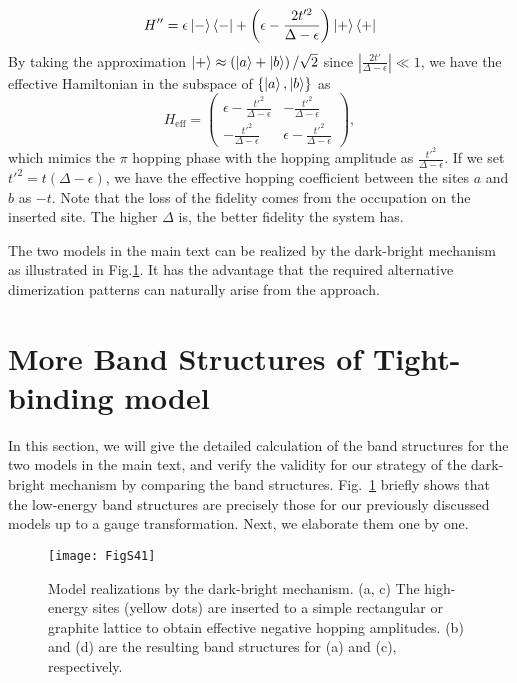 \documentclass[aps,prl,twocolumn,noshowpacs,superscriptaddress]{revtex4-1}
\begin{document}
\begin{equation}
	H''=\epsilon\ket{-}\bra{-}+\left(\epsilon-\frac{2t'^2}{\Delta-\epsilon}\right)\ket{+}\bra{+} %
\end{equation}
By taking the approximation $ \ket{+}\approx\left(\ket{a}+\ket{b}\right)/\sqrt{2} $ since $ |\frac{2t'}{\Delta-\epsilon}|\ll1 $, we have the effective Hamiltonian in the subspace of $ \{\ket{a},\ket{b}\}$ as
\begin{equation}\label{heff}
	H_{\text{eff}}=\begin{pmatrix}
		\epsilon-\frac{t'^2}{\Delta-\epsilon} & -\frac{t'^2}{\Delta-\epsilon} \\  -\frac{t'^2}{\Delta-\epsilon} &  \epsilon-\frac{t'^2}{\Delta-\epsilon}
	\end{pmatrix},
\end{equation}
which mimics the $ \pi $ hopping phase with the hopping amplitude as $ \frac{t'^2}{\Delta-\epsilon} $. If we set $ t'^2=t(\Delta-\epsilon) $, we have the effective hopping coefficient between the sites $ a $ and $ b $ as $ -t $. Note that the loss of the fidelity comes from the occupation on the inserted site. The higher $ \Delta $ is, the better fidelity the system has.

The two models in the main text can be realized by the dark-bright mechanism as illustrated in Fig.\ref{figs2-0}. It has the advantage that the required alternative dimerization patterns can naturally arise from the approach.





\section{More Band Structures of Tight-binding model}

In this section, we will give the detailed calculation of the band structures for the two models in the main text, and verify the validity for our strategy of the dark-bright mechanism by comparing the band structures. Fig.~\ref{figs2-0} briefly shows that the low-energy band structures are precisely those for our previously discussed models up to a gauge transformation. Next, we elaborate them one by one.

\begin{figure}[h]
	\centering
	\texttt{[image: FigS41]}
	\caption{Model realizations by the dark-bright mechanism. (a, c) The high-energy sites (yellow dots) are inserted to a simple rectangular or graphite lattice to obtain effective negative hopping amplitudes. (b) and (d) are the resulting band structures for (a) and (c), respectively. }
	\label{figs2-0}
\end{figure}
\end{document}
